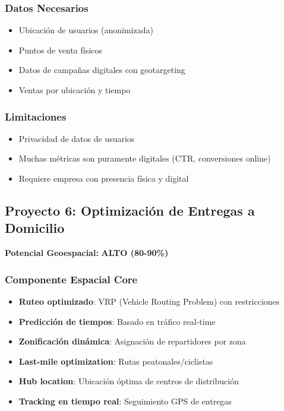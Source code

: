 \documentclass[11pt,a4paper]{article}
\newcommand{\alto}[1]{\textcolor{verde}{\textbf{#1}}}
\begin{document}
\subsubsection{Datos Necesarios}
\begin{itemize}
    \item Ubicación de usuarios (anonimizada)
    \item Puntos de venta físicos
    \item Datos de campañas digitales con geotargeting
    \item Ventas por ubicación y tiempo
\end{itemize}

\subsubsection{Limitaciones}
\begin{itemize}
    \item Privacidad de datos de usuarios
    \item Muchas métricas son puramente digitales (CTR, conversiones online)
    \item Requiere empresa con presencia física y digital
\end{itemize}

\newpage

\subsection{Proyecto 6: Optimización de Entregas a Domicilio}

\begin{tcolorbox}[colframe=verde,colback=green!10]
\textbf{Potencial Geoespacial:} \alto{ALTO (80-90\%)}
\end{tcolorbox}

\subsubsection{Componente Espacial Core}

\begin{itemize}
    \item \textbf{Ruteo optimizado}: VRP (Vehicle Routing Problem) con restricciones
    \item \textbf{Predicción de tiempos}: Basado en tráfico real-time
    \item \textbf{Zonificación dinámica}: Asignación de repartidores por zona
    \item \textbf{Last-mile optimization}: Rutas peatonales/ciclistas
    \item \textbf{Hub location}: Ubicación óptima de centros de distribución
    \item \textbf{Tracking en tiempo real}: Seguimiento GPS de entregas
\end{itemize}
\end{document}
